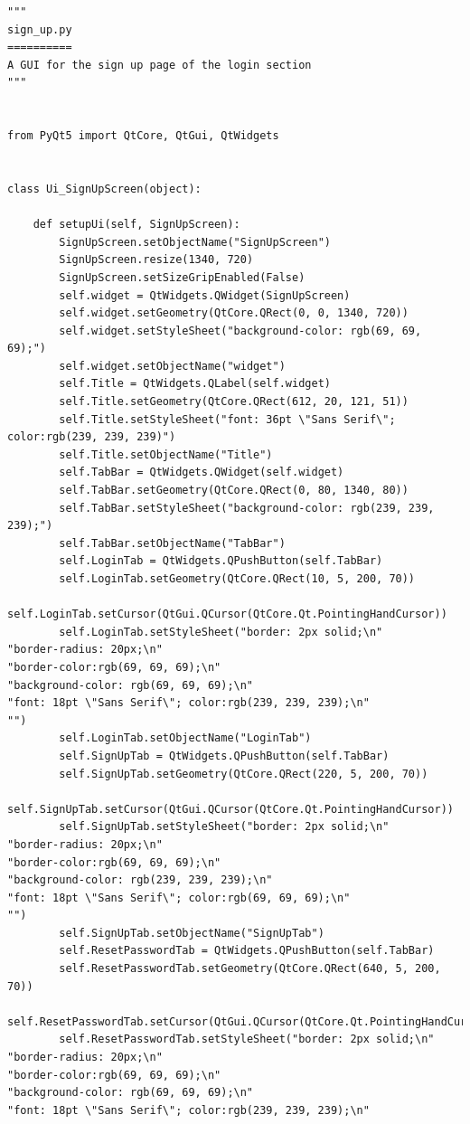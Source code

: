 \documentclass{article}
\begin{document}
\begin{lstlisting}
"""
sign_up.py
==========
A GUI for the sign up page of the login section
"""


from PyQt5 import QtCore, QtGui, QtWidgets


class Ui_SignUpScreen(object):

    def setupUi(self, SignUpScreen):
        SignUpScreen.setObjectName("SignUpScreen")
        SignUpScreen.resize(1340, 720)
        SignUpScreen.setSizeGripEnabled(False)
        self.widget = QtWidgets.QWidget(SignUpScreen)
        self.widget.setGeometry(QtCore.QRect(0, 0, 1340, 720))
        self.widget.setStyleSheet("background-color: rgb(69, 69, 69);")
        self.widget.setObjectName("widget")
        self.Title = QtWidgets.QLabel(self.widget)
        self.Title.setGeometry(QtCore.QRect(612, 20, 121, 51))
        self.Title.setStyleSheet("font: 36pt \"Sans Serif\"; color:rgb(239, 239, 239)")
        self.Title.setObjectName("Title")
        self.TabBar = QtWidgets.QWidget(self.widget)
        self.TabBar.setGeometry(QtCore.QRect(0, 80, 1340, 80))
        self.TabBar.setStyleSheet("background-color: rgb(239, 239, 239);")
        self.TabBar.setObjectName("TabBar")
        self.LoginTab = QtWidgets.QPushButton(self.TabBar)
        self.LoginTab.setGeometry(QtCore.QRect(10, 5, 200, 70))
        self.LoginTab.setCursor(QtGui.QCursor(QtCore.Qt.PointingHandCursor))
        self.LoginTab.setStyleSheet("border: 2px solid;\n"
"border-radius: 20px;\n"
"border-color:rgb(69, 69, 69);\n"
"background-color: rgb(69, 69, 69);\n"
"font: 18pt \"Sans Serif\"; color:rgb(239, 239, 239);\n"
"")
        self.LoginTab.setObjectName("LoginTab")
        self.SignUpTab = QtWidgets.QPushButton(self.TabBar)
        self.SignUpTab.setGeometry(QtCore.QRect(220, 5, 200, 70))
        self.SignUpTab.setCursor(QtGui.QCursor(QtCore.Qt.PointingHandCursor))
        self.SignUpTab.setStyleSheet("border: 2px solid;\n"
"border-radius: 20px;\n"
"border-color:rgb(69, 69, 69);\n"
"background-color: rgb(239, 239, 239);\n"
"font: 18pt \"Sans Serif\"; color:rgb(69, 69, 69);\n"
"")
        self.SignUpTab.setObjectName("SignUpTab")
        self.ResetPasswordTab = QtWidgets.QPushButton(self.TabBar)
        self.ResetPasswordTab.setGeometry(QtCore.QRect(640, 5, 200, 70))
        self.ResetPasswordTab.setCursor(QtGui.QCursor(QtCore.Qt.PointingHandCursor))
        self.ResetPasswordTab.setStyleSheet("border: 2px solid;\n"
"border-radius: 20px;\n"
"border-color:rgb(69, 69, 69);\n"
"background-color: rgb(69, 69, 69);\n"
"font: 18pt \"Sans Serif\"; color:rgb(239, 239, 239);\n"

\end{lstlisting}
\end{document}

